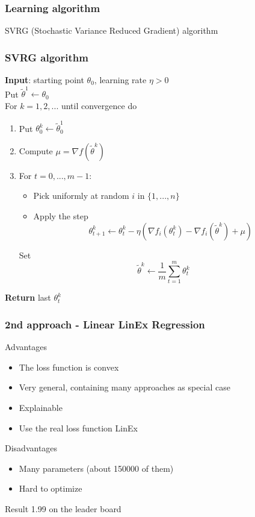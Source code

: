 \documentclass{beamer}
\begin{document}
\begin{frame}\frametitle{Learning algorithm}
SVRG (Stochastic Variance Reduced Gradient) algorithm
\end{frame}

\begin{frame} \frametitle{SVRG algorithm}
\textbf{Input}: starting point $\theta_0$, learning rate $\eta > 0$\\
Put $\tilde{\theta}^1 \leftarrow \theta_0$ \\
For $k=1,2,...$ until convergence do
\begin{enumerate}
\item Put $\theta_0^k \leftarrow \tilde{\theta}^1_0$
\item Compute $\mu = \nabla f(\tilde{\theta}^k)$
\item For $t=0,...,m-1$:
\begin{itemize}
\item Pick uniformly at random $i$ in $\{ 1,...,n \}$
\item Apply the step
$$\theta_{t+1}^k \leftarrow \theta_t^k - \eta(\nabla f_i(\theta_t^k) - \nabla f_i(\tilde{\theta}^k)+\mu)$$
\end{itemize}
Set
$$\tilde{\theta}^k \leftarrow \frac{1}{m} \sum_{t=1}^m \theta^k_t$$
\end{enumerate}
\textbf{Return} last $\theta_t^k$
\end{frame}

\begin{frame}\frametitle{2nd approach - Linear LinEx Regression}
\begin{block}{Advantages}
\begin{itemize}
\item
The loss function is convex
\item
Very general, containing many approaches as special case
\item
Explainable
\item
Use the real loss function LinEx
\end{itemize}
\end{block}
\begin{alertblock}{Disadvantages}
\begin{itemize}
\item
Many parameters (about 150000 of them)
\item
Hard to optimize
\end{itemize}
\end{alertblock}

\begin{exampleblock}{Result}
1.99 on the leader board
\end{exampleblock}
\end{frame}
\end{document}
